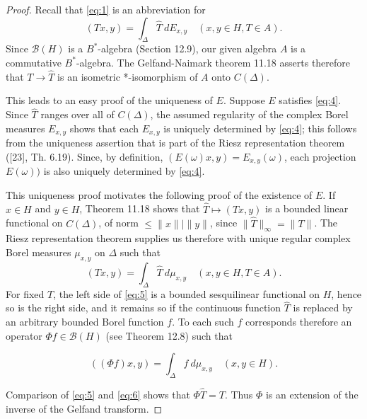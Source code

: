\begin{proof}
  Recall that \eqref{eq:1} is an abbreviation for
  \begin{equation}
    \label{eq:4}
    (Tx , y) = \int_\Delta \widehat{T} \ dE_{x,y} \quad (x,y \in H, T \in A).
  \end{equation}
  Since $\mathcal{B}(H)$ is a $B^*$-algebra (Section 12.9), our given algebra $A$ is a commutative $B^*$-algebra.
  The Gelfand-Naimark theorem 11.18 asserts therefore that $T \to \widehat{T}$ is an isometric *-isomorphism of $A$ onto $C(\Delta)$.

  This leads to an easy proof of the uniqueness of $E$.
  Suppose $E$ satisfies \eqref{eq:4}.
  Since $\widehat{T}$ ranges over all of $C(\Delta)$, the assumed regularity of the complex Borel measures $E_{x,y}$ shows that each $E_{x,y}$ is uniquely determined by \eqref{eq:4}; this follows from the uniqueness assertion that is part of the Riesz representation theorem ([23], Th. 6.19).
  Since, by definition, $(E(\omega)x, y) = E_{x,y}(\omega)$, each projection $E(\omega))$ is also uniquely determined by \eqref{eq:4}.

  This uniqueness proof motivates the following proof of the existence of $E$.
  If $x \in H$ and $y \in H$, Theorem 11.18 shows that $ \widehat{T} \mapsto (Tx, y)$ is a bounded linear functional on $C(\Delta)$, of norm $\leq \|x\|| \|y\|$, since $\| \widehat{T}\|_{\infty} = \|T\|$.
  The Riesz representation theorem supplies us therefore with unique regular complex Borel measures $\mu_{x,y}$ on $\Delta$ such that
  \begin{equation}
    \label{eq:5}
    (Tx , y) = \int_\Delta \widehat{T} \ d\mu_{x,y} \quad (x,y \in H, T \in A).
  \end{equation}
  For fixed \( T \), the left side of \eqref{eq:5} is a bounded sesquilinear functional on \( H \), hence so is the right side, and it remains so if the continuous function
  \( \widehat{T} \) is replaced by an arbitrary bounded Borel function \( f \).
  To each such \( f \) corresponds therefore an operator \( \Phi f \in \mathcal{B}(H) \) (see Theorem 12.8) such that

  \begin{equation}
    \label{eq:6}
    ((\Phi f)x, y) = \int_{\Delta} f \ d\mu_{x,y} \quad (x, y \in H).
  \end{equation}

  Comparison of \eqref{eq:5} and \eqref{eq:6} shows that \( \Phi \hat{T} = T \). Thus \( \Phi \) is an extension of the inverse of the Gelfand transform.


\end{proof}
